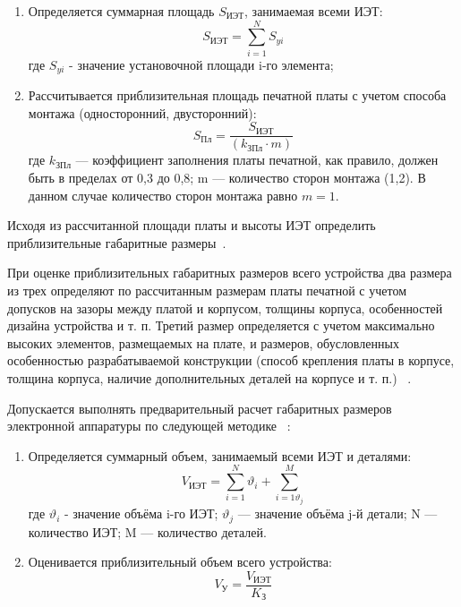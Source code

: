 \begin{enumerate}
\item Определяется суммарная площадь $S_{\text{ИЭТ}}$, занимаемая всеми ИЭТ:
  \begin{equation}
    S_{ИЭТ} = \sum^N_{i=1}S_{yi}
  \end{equation}
  где $S_{yi}$ - значение установочной площади i-го элемента;
\item Рассчитывается приблизительная площадь печатной платы с учетом
  способа монтажа (односторонний, двусторонний):
  \begin{equation}
    S_{Пл} = \frac{S_{ИЭТ}}{(k_{ЗПл} \cdot m)}
  \end{equation}
  где $k_{ЗПл}$ — коэффициент заполнения платы печатной, как правило,
  должен быть в пределах от 0,3 до 0,8;
  m — количество сторон монтажа (1,2).
  В данном случае количество сторон монтажа равно $m=1$.
\end{enumerate}

Исходя из рассчитанной площади платы и высоты ИЭТ определить
приблизительные габаритные размеры~\cite{Kostukevich2012}.

При оценке приблизительных габаритных размеров всего устройства два
размера из трех определяют по рассчитанным размерам платы печатной с
учетом допусков на зазоры между платой и корпусом, толщины корпуса,
особенностей дизайна устройства и т. п.  Третий размер определяется с
учетом максимально высоких элементов, размещаемых на плате, и
размеров, обусловленных особенностью разрабатываемой конструкции
(способ крепления платы в корпусе, толщина корпуса, наличие
дополнительных деталей на корпусе и т. п.) ~\cite{Kostukevich2012}.

Допускается выполнять предварительный расчет габаритных размеров
электронной аппаратуры по следующей методике ~\cite{Kostukevich2012}:
\begin{enumerate}
\item Определяется суммарный объем, занимаемый всеми ИЭТ и деталями:
  \begin{equation}
    V_{ИЭТ} = \sum^N_{i=1}\vartheta_i +   \sum^M_{i=1\vartheta_j}
  \end{equation}
%
где $\vartheta_i$ - значение объёма i-го ИЭТ;
$\vartheta_j$ — значение объёма j-й детали;
N — количество ИЭТ;
M — количество деталей.

\item Оценивается приблизительный объем всего устройства:
  \begin{equation}
    V_{\text{У}} = \frac{V_{\text{ИЭТ}}}{K_{\text{З}}}
  \end{equation}
\end{enumerate}

